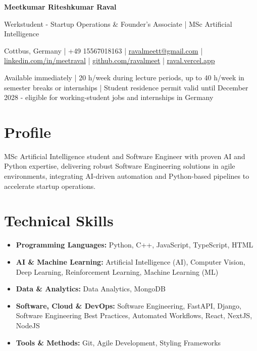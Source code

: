 \documentclass[a4paper,10pt]{article}
\begin{document}
\begin{center}
  {\LARGE\bfseries Meetkumar Riteshkumar Raval}\par\vspace{3pt}
  {\large Werkstudent - Startup Operations \& Founder's Associate | MSc Artificial Intelligence}\par\vspace{3pt}
  {\small Cottbus, Germany | +49 15567018163 | \href{mailto:ravalmeett@gmail.com}{ravalmeett@gmail.com} | \href{https://www.linkedin.com/in/meetraval/}{linkedin.com/in/meetraval} | \href{https://github.com/ravalmeet}{github.com/ravalmeet} | \href{https://raval.vercel.app/}{raval.vercel.app}}\par\vspace{2pt}
  {\small Available immediately | 20 h/week during lecture periods, up to 40 h/week in semester breaks or internships | Student residence permit valid until December 2028 - eligible for working-student jobs and internships in Germany}\par
\end{center}

\section*{Profile}
MSc Artificial Intelligence student and Software Engineer with proven AI and Python expertise, delivering robust Software Engineering solutions in agile environments, integrating AI-driven automation and Python-based pipelines to accelerate startup operations.\par

\section*{Technical Skills}
\begin{itemize}
\item \textbf{Programming Languages:} Python, C++, JavaScript, TypeScript, HTML
\item \textbf{AI \& Machine Learning:} Artificial Intelligence (AI), Computer Vision, Deep Learning, Reinforcement Learning, Machine Learning (ML)
\item \textbf{Data \& Analytics:} Data Analytics, MongoDB
\item \textbf{Software, Cloud \& DevOps:} Software Engineering, FastAPI, Django, Software Engineering Best Practices, Automated Workflows, React, NextJS, NodeJS
\item \textbf{Tools \& Methods:} Git, Agile Development, Styling Frameworks
\end{itemize}
\end{document}
